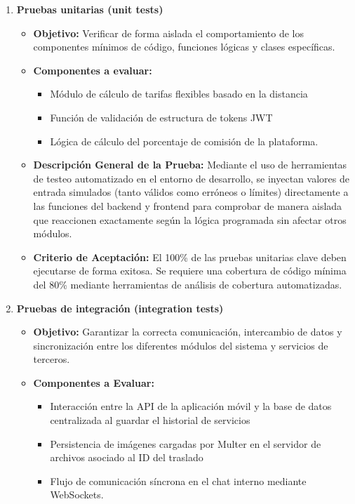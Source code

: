 \begin{enumerate}
	\item \textbf{Pruebas unitarias (unit tests)} 
	\begin{itemize}
		\item \textbf{Objetivo:} Verificar de forma aislada el comportamiento de los componentes mínimos de código, funciones lógicas y clases específicas.
		\item \textbf{Componentes a evaluar:}
		\begin{itemize}
			\item Módulo de cálculo de tarifas flexibles basado en la distancia 
			\item Función de validación de estructura de tokens JWT 
			\item Lógica de cálculo del porcentaje de comisión de la plataforma.
		\end{itemize}
		\item\textbf{Descripción General de la Prueba:} Mediante el uso de herramientas de testeo automatizado en el entorno de desarrollo, se inyectan valores de entrada simulados (tanto válidos como erróneos o límites) directamente a las funciones del backend y frontend para comprobar de manera aislada que reaccionen exactamente según la lógica programada sin afectar otros módulos. 
		\item \textbf{Criterio de Aceptación:} El 100\% de las pruebas unitarias clave deben ejecutarse de forma exitosa. Se requiere una cobertura de código mínima del 80\% mediante herramientas de análisis de cobertura automatizadas.
	\end{itemize}
	\item\textbf{Pruebas de integración (integration tests)}
	\begin{itemize}
		\item \textbf{Objetivo:} Garantizar la correcta comunicación, intercambio de datos y sincronización entre los diferentes módulos del sistema y servicios de terceros.
		\item \textbf{Componentes a Evaluar:}
		\begin{itemize}
			\item Interacción entre la API de la aplicación móvil y la base de datos centralizada al guardar el historial de servicios
			\item Persistencia de imágenes cargadas por Multer en el servidor de archivos asociado al ID del traslado 
			\item Flujo de comunicación síncrona en el chat interno mediante WebSockets.
		\end{itemize}

\end{itemize}
\end{enumerate}
